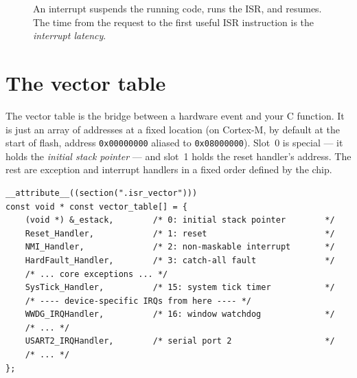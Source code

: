 \documentclass[11pt,a4paper,oneside]{book}
\newcommand{\code}[1]{\texttt{#1}}
\begin{document}
\begin{figure}[h]
\centering
{}
\caption{An interrupt suspends the running code, runs the ISR, and resumes.
The time from the request to the first useful ISR instruction is the
\emph{interrupt latency}.}
\label{fig:irq-timeline}
\end{figure}

\section{The vector table}

The vector table is the bridge between a hardware event and your C function.
It is just an array of addresses at a fixed location (on Cortex-M, by default
at the start of flash, address \code{0x00000000} aliased to
\code{0x08000000}). Slot~0 is special --- it holds the \emph{initial stack
pointer} --- and slot~1 holds the reset handler's address. The rest are
exception and interrupt handlers in a fixed order defined by the chip.

\begin{lstlisting}[caption={Conceptual vector table (Cortex-M, simplified).}]
__attribute__((section(".isr_vector")))
const void * const vector_table[] = {
    (void *) &_estack,        /* 0: initial stack pointer        */
    Reset_Handler,            /* 1: reset                        */
    NMI_Handler,              /* 2: non-maskable interrupt       */
    HardFault_Handler,        /* 3: catch-all fault              */
    /* ... core exceptions ... */
    SysTick_Handler,          /* 15: system tick timer           */
    /* ---- device-specific IRQs from here ---- */
    WWDG_IRQHandler,          /* 16: window watchdog             */
    /* ... */
    USART2_IRQHandler,        /* serial port 2                   */
    /* ... */
};
\end{lstlisting}
\end{document}
